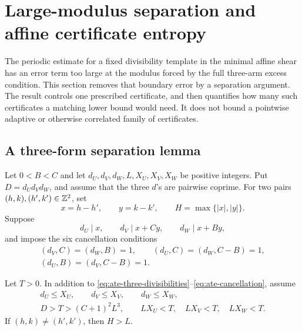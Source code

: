 \section{Large-modulus separation and affine certificate entropy}
\label{sec:affine-template-entropy}

The periodic estimate for a fixed divisibility template in the minimal
affine shear has an error term too large at the modulus forced by the full
three-arm excess condition.  This section removes that boundary error by a
separation argument.  The result controls one prescribed certificate, and
then quantifies how many such certificates a matching lower bound would
need.  It does not bound a pointwise adaptive or otherwise correlated
family of certificates.

\subsection{A three-form separation lemma}

Let $0<B<C$ and let $d_U,d_V,d_W,L,X_U,X_V,X_W$ be positive
integers.  Put $D=d_Ud_Vd_W$, and assume that the three $d$'s are pairwise
coprime.  For two pairs $(h,k),(h',k')\in\mathbb Z^2$, set
\[
 x=h-h',\qquad y=k-k',\qquad H=\max\{|x|,|y|\}.
\]
Suppose
\begin{equation}\label{eq:ate-three-divisibilities}
 d_U\mid x,\qquad d_V\mid x+Cy,\qquad d_W\mid x+By,
\end{equation}
and impose the six cancellation conditions
\begin{equation}\label{eq:ate-cancellation}
\begin{gathered}
 (d_V,C)=(d_W,B)=1,\qquad
 (d_U,C)=(d_W,C-B)=1,\\
 (d_U,B)=(d_V,C-B)=1.
\end{gathered}
\end{equation}

\begin{theorem}
\label{thm:ate-separation}
Let $T>0$.  In addition to
\eqref{eq:ate-three-divisibilities}--\eqref{eq:ate-cancellation}, assume
\begin{equation}\label{eq:ate-caps-gates}
\begin{gathered}
 d_U\le X_U,\qquad d_V\le X_V,\qquad d_W\le X_W,\\
 D>T>(C+1)^2L^3,\qquad
 LX_U<T,\quad LX_V<T,\quad LX_W<T.
\end{gathered}
\end{equation}
If $(h,k)\ne(h',k')$, then $H>L$.
\end{theorem}

